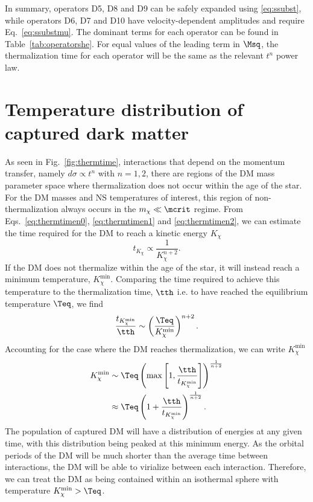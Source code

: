 In summary, operators D5, D8 and D9 can be safely expanded using \ref{eq:ssubst}, while operators D6, D7 and D10 have velocity-dependent amplitudes and require Eq.~\ref{eq:ssubstmu}. 
The dominant terms for each operator can be found in Table~\ref{tab:operatorshe}. 
For equal values of the leading term in $\Msq$, the thermalization time for each operator will be the same as the relevant $t^n$ power law. 


\section{Temperature distribution of captured dark matter}
\label{sec:minTempDerivation}



As seen in Fig.~\ref{fig:thermtime}, interactions that depend on the momentum transfer, namely $d\sigma \propto t^n$ with $n = 1,2$, there are regions of the DM mass parameter space where thermalization does not occur within the age of the star. For the DM masses and NS temperatures of interest, this region of non-thermalization always occurs in the $m_\chi\ll \mcrit$ regime.
From Eqs.~\ref{eq:thermtimen0}, \ref{eq:thermtimen1} and \ref{eq:thermtimen2},  we can estimate the time required for the DM to reach a kinetic energy $K_\chi$ 
\begin{equation}
    t_{K_\chi} \propto \frac{1}{K_\chi^{n+2}}.
\end{equation}
% 
If the DM does not thermalize within the age of the star, it will instead reach a minimum temperature, $K_\chi^{\mathrm{min}}$.  Comparing the time required to achieve this temperature to the thermalization time, $\tth$ i.e. to have reached the equilibrium temperature $\Teq$, we find 
\begin{equation}
    \frac{t_{K_\chi^\mathrm{min}}}{\tth}  \sim \left( \frac{\Teq}{K^{\rm min}_\chi} \right)^{n+2}. 
\end{equation}
Accounting for the case where the DM reaches thermalization, we can write $K_\chi^\mathrm{min}$
\begin{align}
    K^{\rm min}_\chi & \sim \Teq \left(\max\left[ 1,\frac{\tth}{t_{K_\chi^\mathrm{min}}}\right ]\right)^{\frac{1}{n + 2}}\\
           & \approx \Teq \left( 1 + \frac{\tth}{t_{K_\chi^\mathrm{min}}}\right )^{\frac{1}{n + 2}}. 
\end{align}
The population of captured DM will have a distribution of energies at any given time, with this distribution being peaked at this minimum energy.
As the orbital periods of the DM will be much shorter than the average time between interactions, the DM will be able to virialize between each interaction. Therefore, we can treat the DM as being contained within an isothermal sphere with temperature $K^{\rm min}_\chi > \Teq$. 

